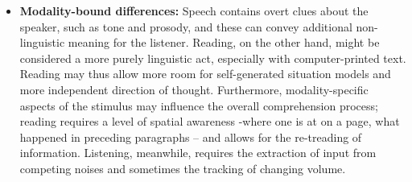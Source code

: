 \begin{itemize}
	\item \textbf{Modality-bound differences:} Speech contains overt clues about the speaker, such as tone and prosody, and these can convey additional non-linguistic meaning for the listener. Reading, on the other hand, might be considered a more purely linguistic act, especially with computer-printed text. Reading may thus allow more room for self-generated situation models and more independent direction of thought. Furthermore, modality-specific aspects of the stimulus may influence the overall comprehension process; reading requires a level of spatial awareness -where one is at on a page, what happened in preceding paragraphs – and allows for the re-treading of information. Listening, meanwhile, requires the extraction of input from competing noises and sometimes the tracking of changing volume. 
\end{itemize}
